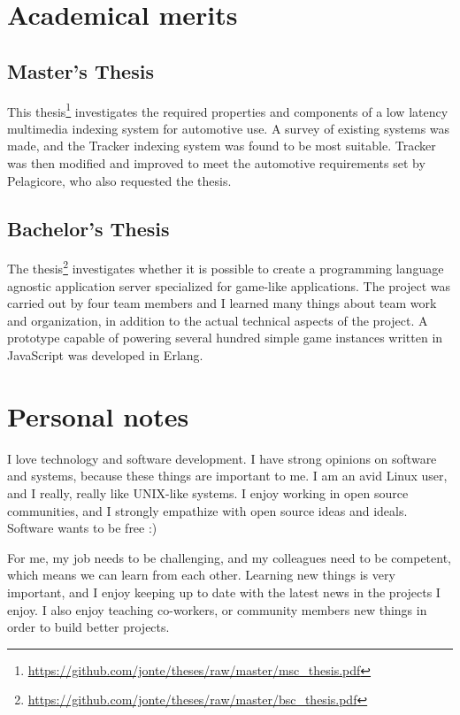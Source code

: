 \documentclass{twocolcv}
\begin{document}
\section*{Academical merits}

  \subsection*{Master's Thesis}
This thesis\footnote{\url{https://github.com/jonte/theses/raw/master/msc_thesis.pdf}} investigates the required properties and components of a low latency multimedia indexing system for automotive use. A survey of existing systems was made, and the Tracker indexing system was found to be most suitable. Tracker was then modified and improved to meet the automotive requirements set by Pelagicore, who also requested the thesis.

\subsection*{Bachelor's Thesis}
The thesis\footnote{\url{https://github.com/jonte/theses/raw/master/bsc_thesis.pdf}} investigates whether it is possible to create a programming language agnostic application server specialized for game-like applications. The project was carried out by four team members and I learned many things about team work and organization, in addition to the actual technical aspects of the project. A prototype capable of powering several hundred simple game instances written in JavaScript was developed in Erlang.

\section*{Personal notes}
I love technology and software development. I have strong opinions on software and systems, because these things are important to me. I am an avid Linux user, and I really, really like UNIX-like systems. I enjoy working in open source communities, and I strongly empathize with open source ideas and ideals. Software wants to be free :)

For me, my job needs to be challenging, and my colleagues need to be competent, which means we can learn from each other. Learning new things is very important, and I enjoy keeping up to date with the latest news in the projects I enjoy. I also enjoy teaching co-workers, or community members new things in order to build better projects.
\end{document}
